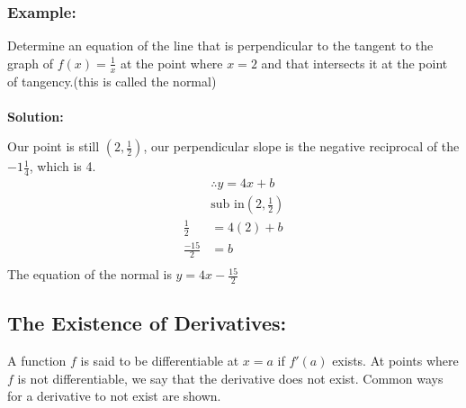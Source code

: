 \documentclass{article}
\begin{document}
\subsubsection*{Example:}
Determine an equation of the line that is perpendicular to the tangent to the graph of $f(x)=\frac{1}{x}$ at the point where $x=2$ and that intersects it at the point of tangency.(this is called the normal) \\  \\ 
\textbf{Solution:}

Our point is still $\left(2,\frac{1}{2}\right)$, our perpendicular slope is the negative reciprocal of the $-1\frac{1}{4}$, which is 4.
\begin{align*}
    &\therefore y=4x+b\\
    &\text{sub in} \left(2,\frac{1}{2}\right)\\
    \frac{1}{2}&=4(2)+b\\
    \frac{-15}{2}&=b\\
\end{align*}
The equation of the normal is $y=4x-\frac{15}{2}$
\subsection*{The Existence of Derivatives:}
A function $f$ is said to be differentiable at $x=a$ if $f'(a)$ exists. At points where $f$ is not differentiable, we say that the derivative does not exist. Common ways for a derivative to not exist are shown.
\end{document}
